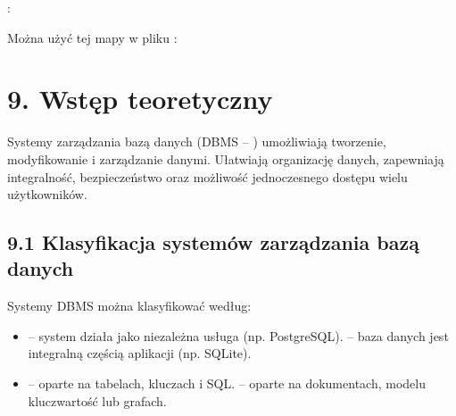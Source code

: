 \documentclass[a4paper,11pt,polish]{sphinxmanual}
\begin{document}
\sphinxAtStartPar
{} :

\begin{sphinxVerbatim}[commandchars=\\\{\}]
              
        
\end{sphinxVerbatim}

\sphinxAtStartPar
Można użyć tej mapy w pliku :

\begin{sphinxVerbatim}[commandchars=\\\{\}]
              
\end{sphinxVerbatim}


\section{9. Wstęp teoretyczny}
\label{\detokenize{Konfiguracja_baz_danych/Konfiguracja_baz_danych:wstep-teoretyczny}}
\sphinxAtStartPar
Systemy zarządzania bazą danych (DBMS – ) umożliwiają tworzenie, modyfikowanie i zarządzanie danymi. Ułatwiają organizację danych, zapewniają integralność, bezpieczeństwo oraz możliwość jednoczesnego dostępu wielu użytkowników.


\subsection{9.1 Klasyfikacja systemów zarządzania bazą danych}
\label{\detokenize{Konfiguracja_baz_danych/Konfiguracja_baz_danych:klasyfikacja-systemow-zarzadzania-baza-danych}}
\sphinxAtStartPar
Systemy DBMS można klasyfikować według:
\begin{itemize}
\item {} 
\sphinxAtStartPar
{}
\sphinxhyphen{}  – system działa jako niezależna usługa (np. PostgreSQL).
\sphinxhyphen{}  – baza danych jest integralną częścią aplikacji (np. SQLite).

\item {} 
\sphinxAtStartPar
{}
\sphinxhyphen{}  – oparte na tabelach, kluczach i SQL.
\sphinxhyphen{}  – oparte na dokumentach, modelu klucz\sphinxhyphen{}wartość lub grafach.

\end{itemize}
\end{document}
